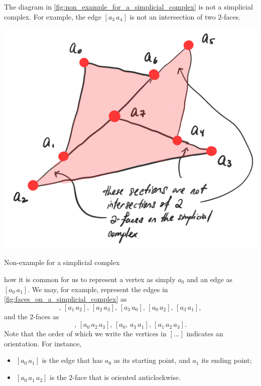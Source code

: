 \documentclass[notoc,notitlepage]{tufte-book}
\begin{document}
\begin{eg}
  The diagram in \cref{fig:non_example_for_a_simplicial_complex} is not a
  simplicial complex. For example, the edge $[a_3 \, a_4]$ is not an
  intersection of two $2$-faces.
  \begin{marginfigure}
    \centering
    \includegraphics[width=\marginparwidth]{images/non-example-simplicial-complex.png}
    \caption{Non-example for a simplicial complex}\label{fig:non_example_for_a_simplicial_complex}
  \end{marginfigure}
\end{eg}

 how it is common for us to represent a vertex as simply $a_0$ and an edge
as $[a_0 \, a_1]$. We may, for example, represent the edges in
\cref{fig:faces_on_a_simplicial_complex} as
\begin{equation*}
  [a_0 \, a_1], \, [a_1 \, a_2], \, [a_2 \, a_3], \, [a_3 \, a_0], \, [a_0 \,
  a_2], \, [a_3 \, a_1],
\end{equation*}
and the $2$-faces as
\begin{equation*}
  [a_0 \, a_1 \, a_2], \, [a_0 \, a_2 \, a_3], \, [a_0, \, a_3 \, a_1], \, [a_1
  \, a_2 \, a_3].
\end{equation*}
Note that the order of which we write the vertices in $[ \hdots ]$ indicates an
orientation. For instance,
\begin{itemize}
  \item $[a_0 \, a_1]$ is the edge that has $a_0$ as its starting point, and
    $a_1$ its ending point;
  \item $[a_0 \, a_1 \, a_2]$ is the $2$-face that is oriented anticlockwise.
\end{itemize}
\end{document}
